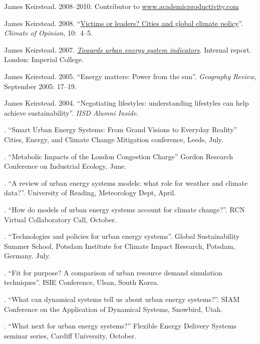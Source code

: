 \documentclass[11pt,a4paper]{article}
\begin{document}
\ind James Keirstead. 2008--2010.  Contributor to \href{http://www.academicproductivity.com}{www.academicproductivity.com}

\ind James Keirstead. 2008. ``\href{http://www.stockholm-network.org/downloads/publications/Climate_of_Opinion_10.pdf}{Victims or leaders? Cities and global climate policy}''. \emph{Climate of Opinion}, 10:~4--5.

\ind James Keirstead. 2007.  \href{http://www3.imperial.ac.uk/pls/portallive/docs/1/24897696.PDF}{\emph{Towards urban energy system indicators}}.  Internal report. London: Imperial College.

\ind James Keirstead. 2005. ``Energy matters: Power from the sun''.  \emph{Geography Review}, September 2005: 17--19.

\ind James Keirstead. 2004. ``Negotiating lifestyles: understanding lifestyles can help achieve sustainability''. \emph{IISD Alumni Inside}.

 \bigskip

\noindent{}%
%
. ``Smart Urban Energy Systems: From Grand Visions to Everyday Reality'' Cities, Energy, and Climate Change Mitigation conference, Leeds, July.

. ``Metabolic Impacts of the London Congestion Charge'' Gordon Research Conference on Industrial Ecology, June.

. ``A review of urban energy systems models: what role for weather and climate data?''. University of Reading,  Meteorology Dept, April.

. ``How do models of urban energy systems account for climate change?''. RCN Virtual Collaboratory Call, October.

. ``Technologies and policies for urban energy systems''.  Global Sustainability Summer School, Potsdam Institute for Climate Impact Research, Potsdam, Germany. July.

. ``Fit for purpose?  A comparison of urban resource demand simulation techniques''.  ISIE Conference, Ulsan, South Korea.

. ``What can dynamical systems tell us about urban energy systems?''.  SIAM Conference on the Application of Dynamical Systems, Snowbird, Utah. 

. ``What next for urban energy systems?'' Flexible Energy Delivery Systems seminar series, Cardiff University. October.
\end{document}
